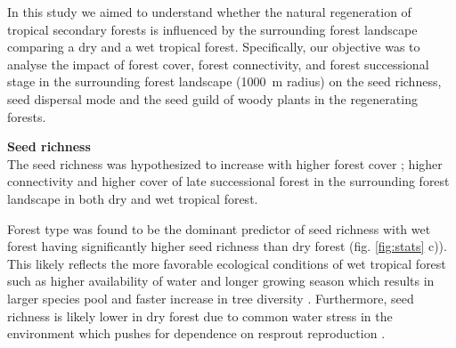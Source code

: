 

In this study we aimed to understand whether the natural regeneration of tropical secondary forests is influenced by the surrounding forest landscape comparing a dry and a wet tropical forest. Specifically, our objective was to analyse the impact of forest cover, forest connectivity, and forest successional stage in the surrounding forest landscape (1000~m radius) on the seed richness, seed dispersal mode and the seed guild of woody plants in the regenerating forests. 


\textbf{Seed richness}\\
The seed richness was hypothesized to increase with higher forest cover \citep{arroyo-rodriguezLandscapescaleForestCover2023a, PEREZCARDENAS2021118818, arroyo-rodriguezMultipleSuccessionalPathways2017}; higher connectivity \citep{huancanunezSeedrainsuccessionalFeedbacksWet2021, hordijkLandUseHistory2024, v.h.safarLandscapeOpennessHas2022a} and higher cover of late successional forest \citep{martinez-ramosNaturalForestRegeneration2016, goosemForestAgeIsolation2016} in the surrounding forest landscape in both dry and wet tropical forest. 

Forest type was found to be the dominant predictor of seed richness with wet forest having significantly higher seed richness than dry forest (fig. \ref{fig:stats} c)). This likely reflects the more favorable ecological conditions of wet tropical forest such as higher availability of water and longer growing season which results in larger species pool and faster increase in tree diversity \citep{souzadepaulaRoleSeedRain2023, hordijkLandUseHistory2024}.
Furthermore, seed richness is likely lower in dry forest due to common water stress in the environment which pushes for dependence on resprout reproduction \citep{souzadepaulaRoleSeedRain2023}. 



